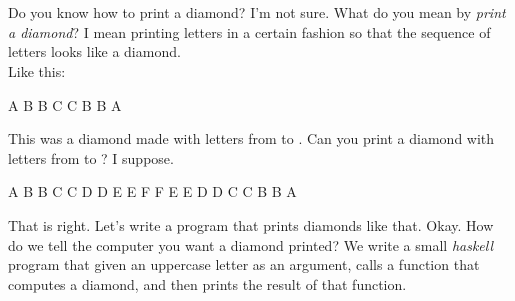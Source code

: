 \newpage
\section*{}
\askfirstN Do you know how to print a diamond?
\answer I'm not sure. What do you mean by \emph{print a diamond}?
\askN I mean printing letters in a certain fashion so that the sequence of letters looks like a diamond. \\
Like this:
\begin{term}[frame=none]
  A
 B B
C   C
 B B
  A
\end{term}
This was a diamond made with letters from  to . Can you print a diamond with letters from  to ?
\answer I suppose.
\begin{term}[frame=none]
     A
    B B
   C   C
  D     D
 E       E
F         F
 E       E
  D     D
   C   C
    B B
     A
\end{term}
\askN That is right. Let's write a program that prints diamonds like that.
\answer Okay. How do we tell the computer you want a diamond printed?
\askN We write a small \emph{haskell} program that given an uppercase letter as an argument, calls a function that computes a diamond, and then prints the result of that function.\\

